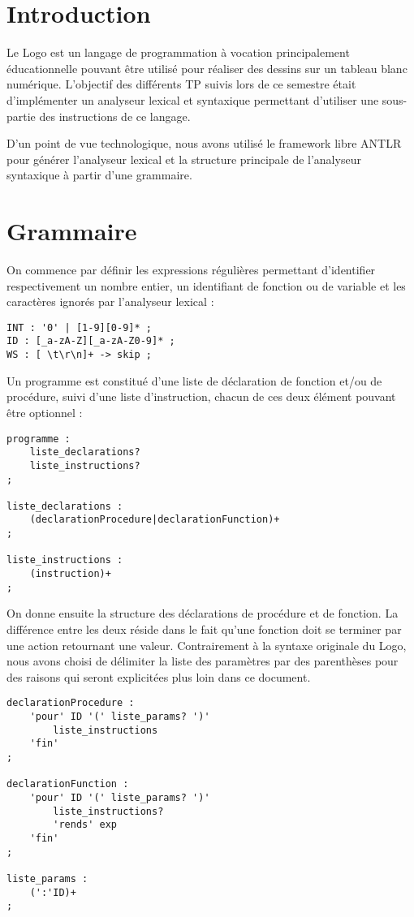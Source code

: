 \documentclass[a4paper,11pt]{article}
\begin{document}


\newpage
\section{Introduction}
Le Logo est un langage de programmation à vocation principalement éducationnelle pouvant être utilisé pour réaliser des dessins sur un tableau blanc numérique.
L'objectif des différents TP suivis lors de ce semestre était d'implémenter un analyseur lexical et syntaxique permettant d'utiliser une sous-partie des instructions de ce langage.

D'un point de vue technologique, nous avons utilisé le framework libre ANTLR pour générer l'analyseur lexical et la structure principale de l'analyseur syntaxique à partir d'une grammaire.

\section{Grammaire}
On commence par définir les expressions régulières permettant d'identifier respectivement un nombre entier, un identifiant de fonction ou de variable et les caractères ignorés par l'analyseur lexical :
\begin{lstlisting}
INT : '0' | [1-9][0-9]* ;
ID : [_a-zA-Z][_a-zA-Z0-9]* ;
WS : [ \t\r\n]+ -> skip ;
\end{lstlisting}

Un programme est constitué d'une liste de déclaration de fonction et/ou de procédure, suivi d'une liste d'instruction, chacun de ces deux élément pouvant être optionnel :
\begin{lstlisting}
programme :
    liste_declarations?
    liste_instructions?
;

liste_declarations :
    (declarationProcedure|declarationFunction)+
;

liste_instructions :
    (instruction)+
;
\end{lstlisting}

On donne ensuite la structure des déclarations de procédure et de fonction.
La différence entre les deux réside dans le fait qu'une fonction doit se terminer par une action retournant une valeur.
Contrairement à la syntaxe originale du Logo, nous avons choisi de délimiter la liste des paramètres par des parenthèses pour des raisons qui seront explicitées plus loin dans ce document.
\begin{lstlisting}
declarationProcedure :
    'pour' ID '(' liste_params? ')'
        liste_instructions
    'fin'
;

declarationFunction :
    'pour' ID '(' liste_params? ')'
        liste_instructions?
        'rends' exp
    'fin'
;

liste_params :
    (':'ID)+
;
\end{lstlisting}
\end{document}
